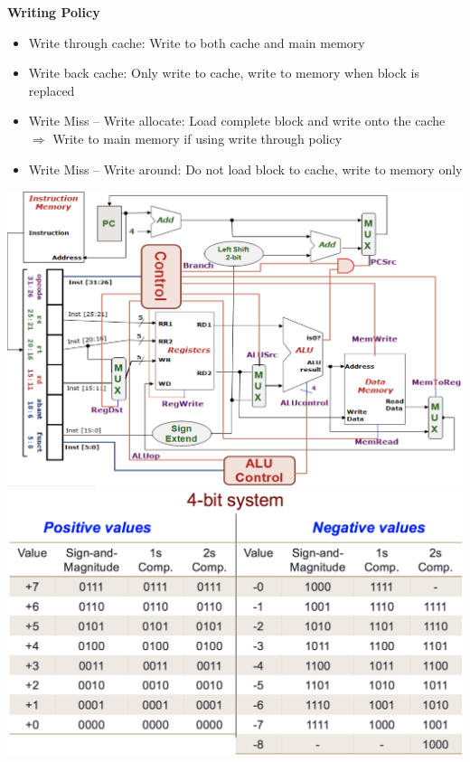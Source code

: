 \documentclass[a4paper]{article} \usepackage[backend=biber, style=numeric, sorting=none]{biblatex}
\begin{document}
\begin{multicols*}{4}
\textbf{{Writing Policy}}
\begin{itemize}[leftmargin=*]
\itemsep -0.5em
\item Write through cache: Write to both cache and main memory
\item Write back cache: Only write to cache, write to memory when block is replaced
\item Write Miss -- Write allocate: Load complete block and write onto the cache $\Rightarrow$ Write to main memory if using write through policy
\item Write Miss -- Write around: Do not load block to cache, write to memory only
\end{itemize}

\vfill\null
\columnbreak
\begin{center}
{\centering \includegraphics[angle=90,origin=c,scale=0.35]{dataPath}}
\\ {\centering \includegraphics[angle=90,origin=c,scale=0.30]{fourBitRepresentation}}

\end{center}
\end{multicols*}
\end{document}

